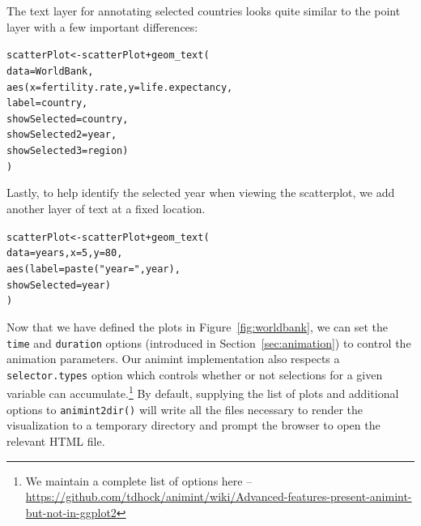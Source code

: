 \documentclass[journal]{vgtc}\usepackage[]{graphicx}\usepackage[]{color}
\makeatletter
\newcommand{\hlnum}[1]{\textcolor[rgb]{0,0,0}{#1}}%
\newcommand{\hlstr}[1]{\textcolor[rgb]{0.502,0,0}{#1}}%
\newcommand{\hlopt}[1]{\textcolor[rgb]{0,0,0}{#1}}%
\newcommand{\hlstd}[1]{\textcolor[rgb]{0,0,0}{#1}}%
\newcommand{\hlkwb}[1]{\textcolor[rgb]{0,0,0}{#1}}%
\newcommand{\hlkwc}[1]{\textcolor[rgb]{0,0,1}{#1}}%
\newcommand{\hlkwd}[1]{\textcolor[rgb]{0,0,0}{#1}}%
\newenvironment{kframe}{%
 \def\at@end@of@kframe{}%
 \ifinner\ifhmode%
  \def\at@end@of@kframe{\end{minipage}}%
  \begin{minipage}{\columnwidth}%
 \fi\fi%
 \def\FrameCommand##1{\hskip\@totalleftmargin \hskip-\fboxsep
 \colorbox{shadecolor}{##1}\hskip-\fboxsep
     \hskip-\linewidth \hskip-\@totalleftmargin \hskip\columnwidth}%
 \MakeFramed {\advance\hsize-\width
   \@totalleftmargin\z@ \linewidth\hsize
   \@setminipage}}%
 {\par\unskip\endMakeFramed%
 \at@end@of@kframe}
\newenvironment{knitrout}{}{} %
\makeatother
\begin{document}
The text layer for annotating selected countries looks quite similar to the 
point layer with a few important differences:

\begin{knitrout}
\color{fgcolor}\begin{kframe}
\begin{alltt}
\hlstd{scatterPlot} \hlkwb{<-} \hlstd{scatterPlot} \hlopt{+} \hlkwd{geom_text}\hlstd{(}
  \hlkwc{data} \hlstd{= WorldBank,}
  \hlkwd{aes}\hlstd{(}\hlkwc{x} \hlstd{= fertility.rate,} \hlkwc{y} \hlstd{= life.expectancy,}
      \hlkwc{label} \hlstd{= country,}
      \hlkwc{showSelected} \hlstd{= country,}
      \hlkwc{showSelected2} \hlstd{= year,}
      \hlkwc{showSelected3} \hlstd{= region)}
\hlstd{)}
\end{alltt}
\end{kframe}
\end{knitrout}

Lastly, to help identify the selected year when viewing the scatterplot, 
we add another layer of text at a fixed location.

\begin{knitrout}
\color{fgcolor}\begin{kframe}
\begin{alltt}
\hlstd{scatterPlot} \hlkwb{<-} \hlstd{scatterPlot} \hlopt{+} \hlkwd{geom_text}\hlstd{(}
  \hlkwc{data} \hlstd{= years,} \hlkwc{x} \hlstd{=} \hlnum{5}\hlstd{,} \hlkwc{y} \hlstd{=} \hlnum{80}\hlstd{,}
  \hlkwd{aes}\hlstd{(}\hlkwc{label} \hlstd{=} \hlkwd{paste}\hlstd{(}\hlstr{"year ="}\hlstd{, year),}
      \hlkwc{showSelected} \hlstd{= year)}
\hlstd{)}
\end{alltt}
\end{kframe}
\end{knitrout}

Now that we have defined the plots in Figure~\ref{fig:worldbank}, we can set
the \texttt{time} and \texttt{duration} options (introduced in Section~\ref{sec:animation}) to control the animation parameters. Our animint implementation also respects a \texttt{selector.types} option which controls whether or not selections for a given variable can accumulate.\footnote{We maintain a complete list of options here -- \url{https://github.com/tdhock/animint/wiki/Advanced-features-present-animint-but-not-in-ggplot2}} By default, supplying the list of 
plots and additional options to 
\texttt{animint2dir()} will write all the files necessary to render 
the visualization to a temporary directory and prompt the browser to 
open the relevant HTML file.
\end{document}
